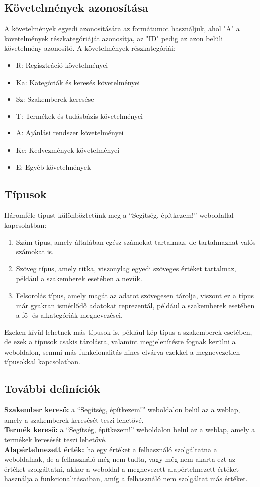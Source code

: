 \subsection{Követelmények azonosítása}
A követelmények egyedi azonosítására az  formátumot használjuk, ahol "A" a követelmények részkategóriáját azonosítja, az "ID" pedig az azon belüli követelmény azonosító.
A követelmények részkategóriái:
\begin{itemize}
    \item R: Regisztráció követelményei
    \item Ka: Kategóriák és keresés követelményei
    \item Sz: Szakemberek keresése
    \item T: Termékek és tudásbázis követelményei
    \item A: Ajánlási rendszer követelményei
    \item Ke: Kedvezmények követelményei
    \item E: Egyéb követelmények
\end{itemize}

\subsection{Típusok}
Háromféle típust különböztetünk meg a “Segítség, építkezem!” weboldallal kapcsolatban:
\begin{enumerate}
    \item Szám típus, amely általában egész számokat tartalmaz, de tartalmazhat valós számokat is.
    \item Szöveg típus, amely ritka, viszonylag egyedi szöveges értéket tartalmaz, például a szakemberek esetében a nevük.
    \item Felsorolás típus, amely magát az adatot szövegesen tárolja, viszont ez a típus már gyakran ismétlődő adatokat reprezentál, például a szakemberek esetében a fő- és alkategóriák megnevezései.
\end{enumerate}

Ezeken kívül lehetnek más típusok is, például kép típus a szakemberek esetében, de ezek a típusok csakis tárolásra, valamint megjelenítésre fognak kerülni a weboldalon, semmi más funkcionalitás nincs elvárva ezekkel a megnevezetlen típusokkal kapcsolatban.


\subsection{További definíciók}
\textbf{Szakember kereső:} a “Segítség, építkezem!” weboldalon belül az a weblap, amely a szakemberek keresését teszi lehetővé.\\
\textbf{Termék kereső:} a “Segítség, építkezem!” weboldalon belül az a weblap, amely a termékek keresését teszi lehetővé.\\
\textbf{Alapértelmezett érték:} ha egy értéket a felhasználó szolgáltatna a weboldalnak, de a felhasználó még nem tudta, vagy még nem akarta ezt az értéket szolgáltatni, akkor a weboldal a megnevezett alapértelmezett értéket használja a funkcionalitásaiban, amíg a felhasználó nem szolgáltat más értéket.
